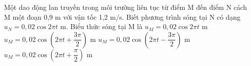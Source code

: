 \begin{ex}%
Một dao động lan truyền trong môi trường liên tục từ điểm M đến điểm N cách M một đoạn 0,9 m với vận tốc 1,2 m/s. Biết phương trình sóng tại N có dạng $u_N=0,02\cos2\pi t$ m. Biểu thức sóng tại M là
\choice
{$u_M =0,02\cos2\pi t$ m}
{\True $u_M=0,02\cos(2\pi t + \dfrac{3\pi}{2})$ m}
{$u_M=0,02\cos(2\pi t - \dfrac{3\pi}{2})$ m}
{$u_M=0,02\cos(2\pi t + \dfrac{\pi}{2})$ m}
\end{ex} 

